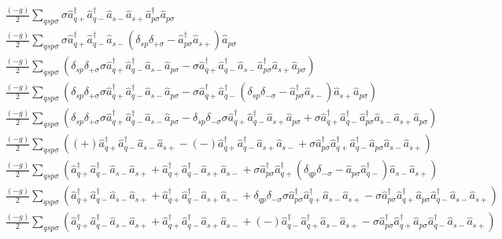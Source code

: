 \documentclass[11pt]{article}
\newcommand{\cop}[2]{%
	\ensuremath{ \hat{a} _{#1 #2} ^{\dagger} }}
\newcommand{\aop}[2]{%
	\ensuremath{ \hat{a} _{#1 #2} }}
\newcommand{\krondelt}[2]{%
	\ensuremath{ \delta _{#1 #2} }}
\begin{document}
\begin{align*}
	& \frac{(-g)}{2} \sum_{qs p \sigma} \sigma \cop{q}{+} \cop{q}{-} \aop{s}{-} \aop{s}{+} \cop{p}{\sigma} \aop{p}{\sigma}\\
	& \frac{(-g)}{2} \sum_{qs p \sigma} \sigma \cop{q}{+} \cop{q}{-} \aop{s}{-} \left ( \krondelt{s}{p} \krondelt{+}{\sigma} - \cop{p}{\sigma} \aop{s}{+} \right ) \aop{p}{\sigma}\\
	& \frac{(-g)}{2} \sum_{qs p \sigma} \left ( \krondelt{s}{p} \krondelt{+}{\sigma} \sigma \cop{q}{+} \cop{q}{-} \aop{s}{-} \aop{p}{\sigma} - \sigma \cop{q}{+} \cop{q}{-} \aop{s}{-} \cop{p}{\sigma} \aop{s}{+} \aop{p}{\sigma} \right )\\
	& \frac{(-g)}{2} \sum_{qs p \sigma} \left ( \krondelt{s}{p} \krondelt{+}{\sigma} \sigma \cop{q}{+} \cop{q}{-} \aop{s}{-} \aop{p}{\sigma} - \sigma \cop{q}{+} \cop{q}{-} \left ( \krondelt{s}{p} \krondelt{-}{\sigma} - \cop{p}{\sigma} \aop{s}{-} \right ) \aop{s}{+} \aop{p}{\sigma} \right )\\
	& \frac{(-g)}{2} \sum_{qs p \sigma} \left ( \krondelt{s}{p} \krondelt{+}{\sigma} \sigma \cop{q}{+} \cop{q}{-} \aop{s}{-} \aop{p}{\sigma} - \krondelt{s}{p} \krondelt{-}{\sigma} \sigma \cop{q}{+} \cop{q}{-} \aop{s}{+} \aop{p}{\sigma} + \sigma \cop{q}{+} \cop{q}{-} \cop{p}{\sigma} \aop{s}{-} \aop{s}{+} \aop{p}{\sigma}  \right )\\
	& \frac{(-g)}{2} \sum_{qs p \sigma} \left ( (+) \cop{q}{+} \cop{q}{-} \aop{s}{-} \aop{s}{+} -  (-) \cop{q}{+} \cop{q}{-} \aop{s}{+} \aop{s}{-} + \sigma \cop{p}{\sigma} \cop{q}{+} \cop{q}{-} \aop{p}{\sigma} \aop{s}{-} \aop{s}{+}  \right )\\
	& \frac{(-g)}{2} \sum_{qs p \sigma} \left ( \cop{q}{+} \cop{q}{-} \aop{s}{-} \aop{s}{+} + \cop{q}{+} \cop{q}{-} \aop{s}{+} \aop{s}{-} + \sigma \cop{p}{\sigma} \cop{q}{+} \left ( \krondelt{q}{p} \krondelt{-}{\sigma} - \aop{p}{\sigma} \cop{q}{-} \right ) \aop{s}{-} \aop{s}{+}  \right )\\
	& \frac{(-g)}{2} \sum_{qs p \sigma} \left ( \cop{q}{+} \cop{q}{-} \aop{s}{-} \aop{s}{+} + \cop{q}{+} \cop{q}{-} \aop{s}{+} \aop{s}{-} + \krondelt{q}{p} \krondelt{-}{\sigma} \sigma \cop{p}{\sigma} \cop{q}{+} \aop{s}{-} \aop{s}{+} - \sigma \cop{p}{\sigma} \cop{q}{+} \aop{p}{\sigma} \cop{q}{-} \aop{s}{-} \aop{s}{+}  \right )\\
	& \frac{(-g)}{2} \sum_{qs p \sigma} \left ( \cop{q}{+} \cop{q}{-} \aop{s}{-} \aop{s}{+} + \cop{q}{+} \cop{q}{-} \aop{s}{+} \aop{s}{-} + (-) \cop{q}{-} \cop{q}{+} \aop{s}{-} \aop{s}{+} - \sigma \cop{p}{\sigma} \cop{q}{+} \aop{p}{\sigma} \cop{q}{-} \aop{s}{-} \aop{s}{+}  \right )\\

\end{align*}
\end{document}
